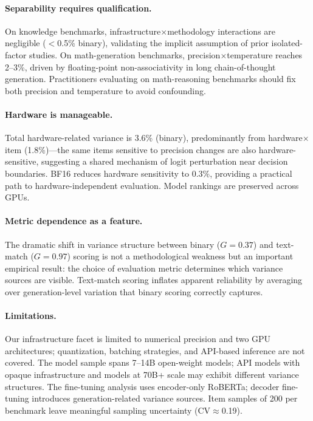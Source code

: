 \documentclass[11pt,twocolumn]{article}
\begin{document}
\paragraph{Separability requires qualification.}
On knowledge benchmarks, infrastructure$\times$methodology interactions are negligible ($<$0.5\% binary), validating the implicit assumption of prior isolated-factor studies. On math-generation benchmarks, precision$\times$temperature reaches 2--3\%, driven by floating-point non-associativity in long chain-of-thought generation. Practitioners evaluating on math-reasoning benchmarks should fix both precision and temperature to avoid confounding.

\paragraph{Hardware is manageable.}
Total hardware-related variance is 3.6\% (binary), predominantly from hardware$\times$item (1.8\%)---the same items sensitive to precision changes are also hardware-sensitive, suggesting a shared mechanism of logit perturbation near decision boundaries. BF16 reduces hardware sensitivity to 0.3\%, providing a practical path to hardware-independent evaluation. Model rankings are preserved across GPUs.

\paragraph{Metric dependence as a feature.}
The dramatic shift in variance structure between binary ($G=0.37$) and text-match ($G=0.97$) scoring is not a methodological weakness but an important empirical result: the choice of evaluation metric determines which variance sources are visible. Text-match scoring inflates apparent reliability by averaging over generation-level variation that binary scoring correctly captures.

\paragraph{Limitations.}
Our infrastructure facet is limited to numerical precision and two GPU architectures; quantization, batching strategies, and API-based inference are not covered. The model sample spans 7--14B open-weight models; API models with opaque infrastructure and models at 70B+ scale may exhibit different variance structures. The fine-tuning analysis uses encoder-only RoBERTa; decoder fine-tuning introduces generation-related variance sources. Item samples of 200 per benchmark leave meaningful sampling uncertainty (CV$\approx$0.19).
\end{document}
